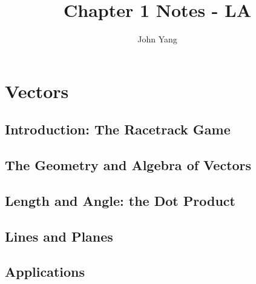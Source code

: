 \documentclass{article}
\title{Chapter 1 Notes - LA} %
\author{John Yang}
\begin{document}
    \maketitle
    \tableofcontents
    \section{Vectors} %
    \setcounter{subsection}{-1}
    \subsection{Introduction: The Racetrack Game} %
    \begin{outline}
        
    \end{outline}
    \subsection{The Geometry and Algebra of Vectors}
    \begin{outline}
        
    \end{outline}
    \subsection{Length and Angle: the Dot Product}
    \begin{outline}
        
    \end{outline}
    \subsection{Lines and Planes}
    \begin{outline}
        
    \end{outline}
    \subsection{Applications}
    \begin{outline}
        
    \end{outline}
\end{document}
